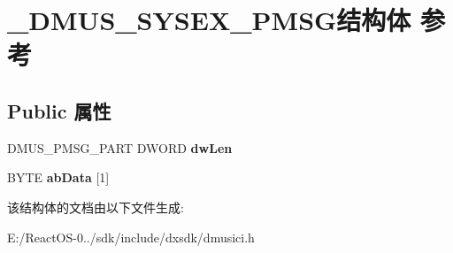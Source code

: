 \hypertarget{struct___d_m_u_s___s_y_s_e_x___p_m_s_g}{}\section{\+\_\+\+D\+M\+U\+S\+\_\+\+S\+Y\+S\+E\+X\+\_\+\+P\+M\+S\+G结构体 参考}
\label{struct___d_m_u_s___s_y_s_e_x___p_m_s_g}
\subsection*{Public 属性}
\begin{DoxyCompactItemize}
\item 
\mbox{\label{struct___d_m_u_s___s_y_s_e_x___p_m_s_g_ae69b4abe8d066fe76dac48c5e0e4c845}} 
D\+M\+U\+S\+\_\+\+P\+M\+S\+G\+\_\+\+P\+A\+RT D\+W\+O\+RD {\bfseries dw\+Len}
\item 
\mbox{\label{struct___d_m_u_s___s_y_s_e_x___p_m_s_g_ab4358aa2a6d1ba7c3ce35a6b995d1384}} 
B\+Y\+TE {\bfseries ab\+Data} \mbox{[}1\mbox{]}
\end{DoxyCompactItemize}


该结构体的文档由以下文件生成\+:\begin{DoxyCompactItemize}
\item 
E\+:/\+React\+O\+S-\/0../sdk/include/dxsdk/dmusici.\+h\end{DoxyCompactItemize}
